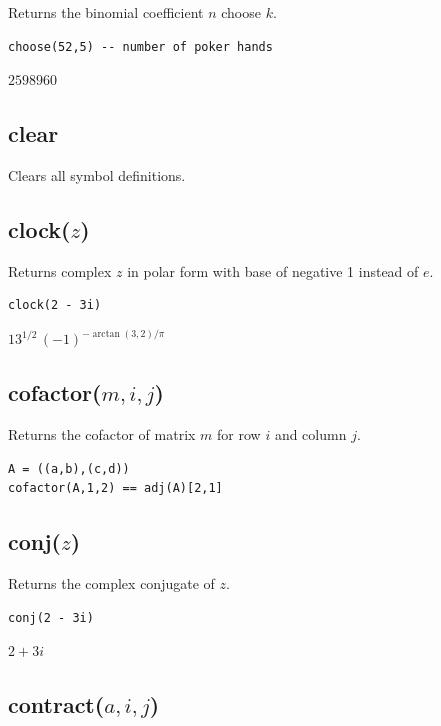 \documentclass[12pt]{article}
\begin{document}
Returns the binomial coefficient $n$ choose $k$.

{\color{blue}
\begin{verbatim}
choose(52,5) -- number of poker hands
\end{verbatim}
}

\noindent
$2598960$

\subsection*{clear}

Clears all symbol definitions.

\subsection*{clock($z$)}

Returns complex $z$ in polar form with base of negative 1 instead of $e$.

{\color{blue}
\begin{verbatim}
clock(2 - 3i)
\end{verbatim}
}

\noindent
$13^{1/2}\,(-1)^{-\arctan(3,2)/\pi}$

\subsection*{cofactor($m,i,j$)}

Returns the cofactor of matrix $m$ for row $i$ and column $j$.

{\color{blue}
\begin{verbatim}
A = ((a,b),(c,d))
cofactor(A,1,2) == adj(A)[2,1]
\end{verbatim}
}


\subsection*{conj($z$)}

Returns the complex conjugate of $z$.

{\color{blue}
\begin{verbatim}
conj(2 - 3i)
\end{verbatim}
}

\noindent
$2 + 3 i$

\subsection*{contract($a,i,j$)}
\end{document}
